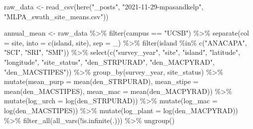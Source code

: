 \documentclass[
]{article}
\newenvironment{Shaded}{\begin{snugshade}}{\end{snugshade}}
\newcommand{\AttributeTok}[1]{\textcolor[rgb]{0.77,0.63,0.00}{#1}}
\newcommand{\FunctionTok}[1]{\textcolor[rgb]{0.00,0.00,0.00}{#1}}
\newcommand{\NormalTok}[1]{#1}
\newcommand{\OtherTok}[1]{\textcolor[rgb]{0.56,0.35,0.01}{#1}}
\newcommand{\SpecialCharTok}[1]{\textcolor[rgb]{0.00,0.00,0.00}{#1}}
\newcommand{\StringTok}[1]{\textcolor[rgb]{0.31,0.60,0.02}{#1}}
\begin{document}
\begin{Shaded}
\begin{Highlighting}[]
\NormalTok{raw\_data }\OtherTok{\textless{}{-}} \FunctionTok{read\_csv}\NormalTok{(}\FunctionTok{here}\NormalTok{(}\StringTok{"\_posts"}\NormalTok{, }\StringTok{"2021{-}11{-}29{-}mpasandkelp"}\NormalTok{, }\StringTok{"MLPA\_swath\_site\_means.csv"}\NormalTok{))}


\NormalTok{annual\_mean }\OtherTok{\textless{}{-}}\NormalTok{ raw\_data }\SpecialCharTok{\%\textgreater{}\%} 
  \FunctionTok{filter}\NormalTok{(campus }\SpecialCharTok{==} \StringTok{"UCSB"}\NormalTok{) }\SpecialCharTok{\%\textgreater{}\%}
  \FunctionTok{separate}\NormalTok{(}\AttributeTok{col =}\NormalTok{ site, }\AttributeTok{into =} \FunctionTok{c}\NormalTok{(}\StringTok{\textquotesingle{}island\textquotesingle{}}\NormalTok{, }\StringTok{\textquotesingle{}site\textquotesingle{}}\NormalTok{), }\AttributeTok{sep =} \StringTok{\textquotesingle{}\_\textquotesingle{}}\NormalTok{) }\SpecialCharTok{\%\textgreater{}\%} 
  \FunctionTok{filter}\NormalTok{(island }\SpecialCharTok{\%in\%} \FunctionTok{c}\NormalTok{(}\StringTok{"ANACAPA"}\NormalTok{, }\StringTok{"SCI"}\NormalTok{, }\StringTok{"SRI"}\NormalTok{, }\StringTok{"SMI"}\NormalTok{)) }\SpecialCharTok{\%\textgreater{}\%} 
  \FunctionTok{select}\NormalTok{(}\FunctionTok{c}\NormalTok{(}\StringTok{"survey\_year"}\NormalTok{, }\StringTok{"site"}\NormalTok{, }\StringTok{"island"}\NormalTok{, }\StringTok{"latitude"}\NormalTok{, }
           \StringTok{"longitude"}\NormalTok{, }\StringTok{"site\_status"}\NormalTok{,}
           \StringTok{"den\_STRPURAD"}\NormalTok{, }\StringTok{"den\_MACPYRAD"}\NormalTok{, }\StringTok{"den\_MACSTIPES"}\NormalTok{)) }\SpecialCharTok{\%\textgreater{}\%} 
  \FunctionTok{group\_by}\NormalTok{(survey\_year, site\_status) }\SpecialCharTok{\%\textgreater{}\%} 
  \FunctionTok{mutate}\NormalTok{(}\AttributeTok{mean\_purp =} \FunctionTok{mean}\NormalTok{(den\_STRPURAD),}
         \AttributeTok{mean\_stipe =} \FunctionTok{mean}\NormalTok{(den\_MACSTIPES),}
         \AttributeTok{mean\_mac =} \FunctionTok{mean}\NormalTok{(den\_MACPYRAD)) }\SpecialCharTok{\%\textgreater{}\%} 
  \FunctionTok{mutate}\NormalTok{(}\AttributeTok{log\_urch =} \FunctionTok{log}\NormalTok{(den\_STRPURAD)) }\SpecialCharTok{\%\textgreater{}\%} 
  \FunctionTok{mutate}\NormalTok{(}\AttributeTok{log\_mac =} \FunctionTok{log}\NormalTok{(den\_MACSTIPES)) }\SpecialCharTok{\%\textgreater{}\%}
  \FunctionTok{mutate}\NormalTok{(}\AttributeTok{log\_plant =} \FunctionTok{log}\NormalTok{(den\_MACPYRAD)) }\SpecialCharTok{\%\textgreater{}\%} 
  \FunctionTok{filter\_all}\NormalTok{(}\FunctionTok{all\_vars}\NormalTok{(}\SpecialCharTok{!}\FunctionTok{is.infinite}\NormalTok{(.))) }\SpecialCharTok{\%\textgreater{}\%} 
  \FunctionTok{ungroup}\NormalTok{()}
\end{Highlighting}
\end{Shaded}
\end{document}
